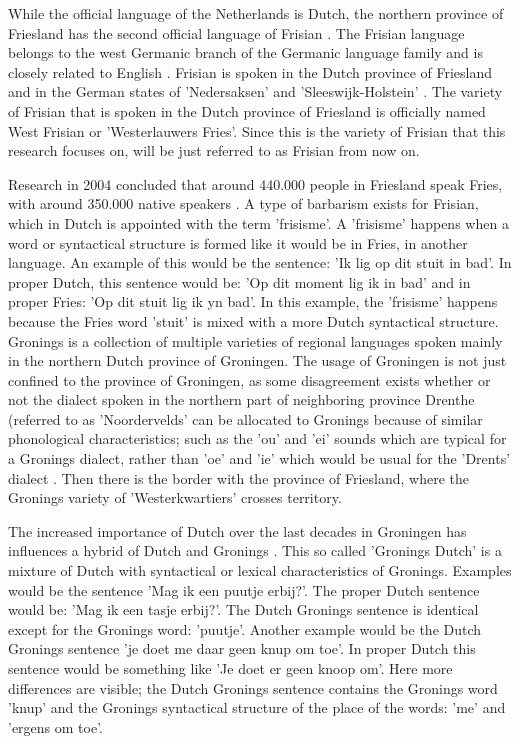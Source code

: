 \documentclass[
10pt, %
a4paper, %
oneside, %
headinclude,footinclude, %
] {book}%
\begin{document}
While the official language of the Netherlands is Dutch, the northern province of Friesland has the second official language of Frisian \citep{streektalen}. 
The Frisian language belongs to the west Germanic branch of the Germanic language family and is closely related to English \citep{streektalen}. Frisian is spoken in the Dutch province of Friesland and in the German states of 'Nedersaksen' and 'Sleeswijk-Holstein' \citep{streektalen}. The variety of Frisian that is spoken in the Dutch province of Friesland is officially named West Frisian or 'Westerlauwers Fries'. Since this is the variety of Frisian that this research focuses on, will be just referred to as Frisian from now on. 

Research in 2004 concluded that around 440.000 people in Friesland speak Fries, with around 350.000 native speakers \citep{lewis}. A type of barbarism exists for Frisian, which in Dutch is appointed with the term 'frisisme'. A 'frisisme' happens when a word or syntactical structure is formed like it would be in Fries, in another language. An example of this would be the sentence: 'Ik lig op dit stuit in bad'. In proper Dutch, this sentence would be: 'Op dit moment lig ik in bad' and in proper Fries: 'Op dit stuit lig ik yn bad'. In this example, the 'frisisme' happens because the Fries word 'stuit' is mixed with a more Dutch syntactical structure. \\

Gronings is a collection of multiple varieties of regional languages spoken mainly in the northern Dutch province of Groningen. The usage of Groningen is not just confined to the province of Groningen, as some disagreement exists whether or not the dialect spoken in the northern part of neighboring province Drenthe (referred to as 'Noordervelds' can be allocated to Gronings because of similar phonological characteristics; such as the 'ou' and 'ei' sounds which are typical for a Gronings dialect, rather than 'oe' and 'ie' which would be usual for the 'Drents' dialect \citep{streektalen}. Then there is the border with the province of Friesland, where the Gronings variety of 'Westerkwartiers' crosses territory.

The increased importance of Dutch over the last decades in Groningen has influences a hybrid of Dutch and Gronings \citep{globalization}. This so called 'Gronings Dutch' is a mixture of Dutch with syntactical or lexical characteristics of Gronings.  Examples would be the sentence 'Mag ik een puutje erbij?'. The proper Dutch sentence would be: 'Mag ik een tasje erbij?'. The Dutch Gronings sentence is identical except for the Gronings word: 'puutje'. Another example would be the Dutch Gronings sentence 'je doet me daar geen knup om toe'. In proper Dutch this sentence would be something like 'Je doet er geen knoop om'. Here more differences are visible; the Dutch Gronings sentence contains the Gronings word 'knup' and the Gronings syntactical structure of the place of the words: 'me' and 'ergens om toe'. 
\end{document}
